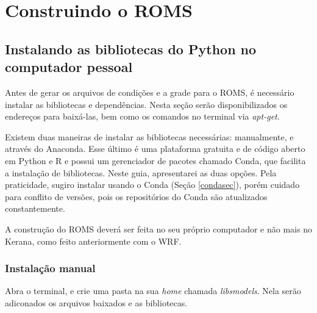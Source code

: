 \chapter{Construindo o ROMS}
\section{Instalando as bibliotecas do Python no computador pessoal}
\bigskip

\noindent Antes de gerar os arquivos de condições e a grade para o ROMS, é necessário instalar as bibliotecas e dependências. Nesta seção serão disponibilizados os endereços para baixá-las, bem como os comandos no terminal via \textit{apt-get}.
\bigskip

\noindent Existem duas maneiras de instalar as bibliotecas necessárias: manualmente, e através do Anaconda. Esse último é uma plataforma gratuita e de código aberto em Python e R e possui um gerenciador de pacotes chamado Conda, que facilita a instalação de bibliotecas. Neste guia, apresentarei as duas opções. Pela praticidade, sugiro instalar usando o Conda (Seção \textcolor{bleu_cite}{\ref{condasec}}), porém cuidado para conflito de versões, pois os repositórios do Conda são atualizados constantemente.
\bigskip

\begin{tcolorbox}[enhanced,
  grow to left by   = 0cm,
  grow to right by  = 0cm,
  enlarge top by    = 0cm,
  enlarge bottom by = 0cm,
  tcbox raise base,
  boxrule           = 1.0pt,
  left              = 18mm,
  colframe          = red!50!black,coltext=red!25!black,colback=red!10!white,
  overlay           = {\begin{tcbclipinterior}\fill[red!75!blue!50!white] (frame.south west)
    rectangle node[text=white,font=\sffamily\bfseries\footnotesize,rotate=0] {ATENÇÃO} ([xshift=18mm]frame.north west);\end{tcbclipinterior}}]
A construção do ROMS deverá ser feita no seu próprio computador e não mais no Kerana, como feito anteriormente com o WRF.
\end{tcolorbox}
\bigskip

\subsection{Instalação manual}
\bigskip
\noindent Abra o terminal, e crie uma pasta na sua \textit{home} chamada \textit{libsmodels}. Nela serão adiconados os arquivos baixados e as bibliotecas.
\bigskip

